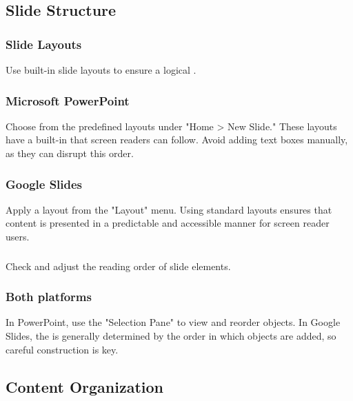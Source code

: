 \subsection{Slide Structure}\label{ch15:ssec:slide-structure}

\subsubsection{Slide Layouts}\label{ch15:sssec:slide-layouts}
Use built-in slide layouts to ensure a logical .

\subsubsection{Microsoft PowerPoint}\label{ch15:sssec:ppt-layouts}
Choose from the predefined layouts under "Home > New Slide." These layouts have a built-in  that screen readers can follow. Avoid adding text boxes manually, as they can disrupt this order.

\subsubsection{Google Slides}\label{ch15:sssec:slides-layouts}
Apply a layout from the "Layout" menu. Using standard layouts ensures that content is presented in a predictable and accessible manner for screen reader users.

\subsubsection{}\label{ch15:sssec:reading-order}
Check and adjust the reading order of slide elements.

\subsubsection{Both platforms}\label{ch15:sssec:reading-order-both}
In PowerPoint, use the "Selection Pane" to view and reorder objects. In Google Slides, the  is generally determined by the order in which objects are added, so careful construction is key.

\subsection{Content Organization}\label{ch15:ssec:content-org}

